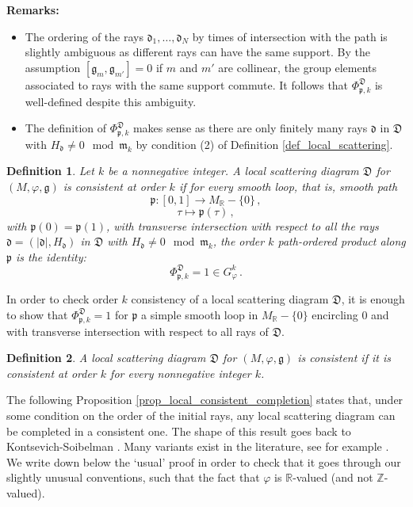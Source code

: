\documentclass[12pt, a4paper]{amsart}
\newtheorem{defn}{Definition}[section]
\newcommand\R{\mathbb R}
\newcommand\Z{\mathbb Z}
\newcommand\fd{\mathfrak d}
\newcommand\fD{\mathfrak D}
\newcommand\fg{\mathfrak g}
\newcommand\fm{\mathfrak m}
\newcommand\fp{\mathfrak p}
\begin{document}
\textbf{Remarks:} 
\begin{itemize}
\item[(i)] The ordering of the rays 
$\fd_1, \dots, \fd_N$ by times of intersection with the path is slightly ambiguous as different rays can have the 
same support. By the assumption $[\fg_m,\fg_{m'}]=0$ if 
$m$ and $m'$ are collinear, the group elements associated to rays with the same support commute. It follows that 
$\Phi_{\fp,k}^{\fD}$ is well-defined despite this ambiguity.
\item[(ii)]  The definition of $\Phi_{\fp,k}^{\fD}$ makes sense as there are only finitely many rays $\fd$ in $\fD$
with $H_\fd \neq 0 \mod \fm_k$ by condition 
(2) of Definition \ref{def_local_scattering}.
\end{itemize}



\begin{defn} \label{def_local_consistency_order_k}
Let $k$ be a nonnegative integer.
A local scattering diagram $\fD$
for $(M, \varphi,\fg)$ is \emph{consistent at order $k$}
if for every smooth loop, that is,  smooth path
\[\fp \colon [0,1] \longrightarrow M_\R-\{0\}\,,\] 
\[\tau \longmapsto \fp(\tau)\,,\]
with $\fp(0)=\fp(1)$, with transverse intersection with respect to all the rays $\fd=(|\fd|,H_\fd)$ in $\fD$
with $H_\fd \neq 0 \mod \fm_k$, the order $k$ path-ordered product along $\fp$ is the identity:
\[\Phi_{\fp,k}^{\fD}=1 \in G_\varphi^k\,.\]
\end{defn}

In order to check order 
$k$ consistency of a local scattering diagram $\fD$, it is enough to show that 
$\Phi_{\fp,k}^{\fD}=1$ for $\fp$ a simple smooth loop in $M_\R-\{0\}$ encircling $0$ and with transverse intersection with respect to all rays of $\fD$.

\begin{defn} \label{def_local_consistency}
A local scattering diagram $\fD$ for $(M, \varphi,\fg)$ is \emph{consistent} if it is consistent at order $k$
for every nonnegative integer $k$.
\end{defn}

The following Proposition \ref{prop_local_consistent_completion}
states that, under some condition on the order of the initial rays, any local scattering diagram can be completed in a consistent one.
The shape of this result goes back to Kontsevich-Soibelman \cite[Theorem 6]{MR2181810}. Many variants exist in the literature, see for example 
\cite[Theorem 1.4]{MR2667135}. 
We write down below the 
`usual' proof in order to check that it goes through our slightly unusual conventions, such that the fact that $\varphi$ is $\R$-valued (and not $\Z$-valued).
 
\end{document}
